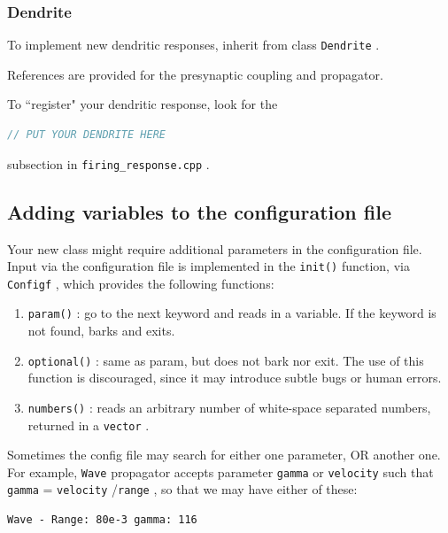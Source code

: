 \documentclass[12pt,a4paper]{article}
\newcommand{\type}[1]{{\small\small\tt #1} }
\begin{document}
\subsubsection{Dendrite}
\label{sec:dendrite}

To implement new dendritic responses, inherit from class \type{Dendrite}.

References are provided for the presynaptic coupling and propagator.

To ``register" your dendritic response, look for the
\begin{lstlisting}[language=C++]
// PUT YOUR DENDRITE HERE
\end{lstlisting}
subsection in \type{firing\_response.cpp}.

\subsection{Adding variables to the configuration file}
\label{sec:init}

Your new class might require additional parameters in the configuration file. Input via the configuration file is implemented in the \type{init()} function, via \type{Configf}, which provides the following functions:
    \begin{enumerate}
        \item \type{param()}: go to the next keyword and reads in a variable. If the keyword is not found, barks and exits.
        \item \type{optional()}: same as param, but does not bark nor exit. The use of this function is discouraged, since it may introduce subtle bugs or human errors.
        \item \type{numbers()}: reads an arbitrary number of white-space separated numbers, returned in a \type{vector}.
    \end{enumerate}

    Sometimes the config file may search for either one parameter, OR another one. For example, \type{Wave} propagator accepts parameter \type{gamma} or \type{velocity} such that \type{gamma} = \type{velocity}/\type{range}, so that we may have either of these:
\begin{lstlisting}
Wave - Range: 80e-3 gamma: 116
\end{lstlisting}
\end{document}
